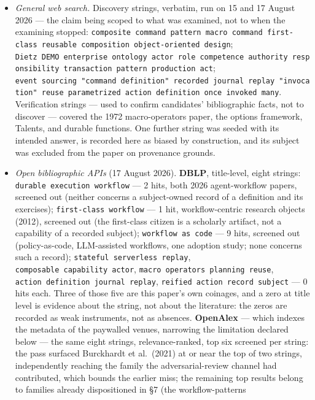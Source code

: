 \documentclass[
]{article}
\newcounter{none} %
\providecommand{\tightlist}{%
  \setlength{\itemsep}{0pt}\setlength{\parskip}{0pt}}
\begin{document}
\begin{itemize}
\tightlist
\item
  \emph{General web search.} Discovery strings, verbatim, run on 15 and
  17 August 2026 --- the claim being scoped to what was examined, not to
  when the examining stopped:
  \texttt{composite\ command\ pattern\ macro\ command\ first-class\ reusable\ composition\ object-oriented\ design};
  \texttt{Dietz\ DEMO\ enterprise\ ontology\ actor\ role\ competence\ authority\ responsibility\ transaction\ pattern\ production\ act};
  \texttt{event\ sourcing\ "command\ definition"\ recorded\ journal\ replay\ "invocation"\ reuse\ parametrized\ action\ definition\ once\ invoked\ many}.
  Verification strings --- used to confirm candidates' bibliographic
  facts, not to discover --- covered the 1972 macro-operators paper, the
  options framework, Talents, and durable functions. One further string
  was seeded with its intended answer, is recorded here as biased by
  construction, and its subject was excluded from the paper on
  provenance grounds.
\item
  \emph{Open bibliographic APIs} (17 August 2026). \textbf{DBLP},
  title-level, eight strings: \texttt{durable\ execution\ workflow} ---
  2 hits, both 2026 agent-workflow papers, screened out (neither
  concerns a subject-owned record of a definition and its exercises);
  \texttt{first-class\ workflow} --- 1 hit, workflow-centric research
  objects (2012), screened out (the first-class citizen is a scholarly
  artifact, not a capability of a recorded subject);
  \texttt{workflow\ as\ code} --- 9 hits, screened out (policy-as-code,
  LLM-assisted workflows, one adoption study; none concerns such a
  record); \texttt{stateful\ serverless\ replay},
  \texttt{composable\ capability\ actor},
  \texttt{macro\ operators\ planning\ reuse},
  \texttt{action\ definition\ journal\ replay},
  \texttt{reified\ action\ record\ subject} --- 0 hits each. Three of
  those five are this paper's own coinages, and a zero at title level is
  evidence about the string, not about the literature: the zeros are
  recorded as weak instruments, not as absences. \textbf{OpenAlex} ---
  which indexes the metadata of the paywalled venues, narrowing the
  limitation declared below --- the same eight strings,
  relevance-ranked, top six screened per string: the pass surfaced
  Burckhardt et al.~(2021) at or near the top of two strings,
  independently reaching the family the adversarial-review channel had
  contributed, which bounds the earlier miss; the remaining top results
  belong to families already dispositioned in §7 (the workflow-patterns

\end{itemize}
\end{document}
